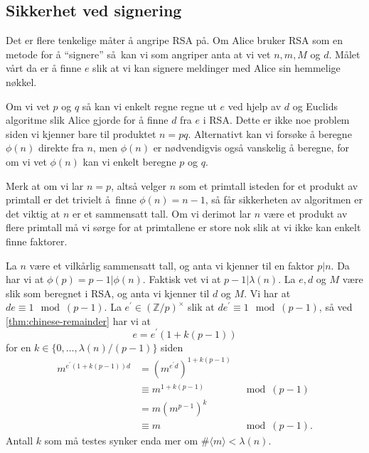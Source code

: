 \subsection{Sikkerhet ved signering}

Det er flere tenkelige måter å angripe RSA på.
Om Alice bruker RSA som en metode for å ``signere'' så kan
vi som angriper anta at vi vet $n, m, M$ og $d$.
Målet vårt da er å finne $e$ slik at vi kan signere meldinger med Alice
sin hemmelige nøkkel.

Om vi vet $p$ og $q$ så kan vi enkelt regne regne ut $e$ ved hjelp av $d$
og Euclids algoritme
slik Alice gjorde for å finne $d$ fra $e$ i RSA.
Dette er ikke noe problem siden vi kjenner bare til produktet $n = pq$.
Alternativt kan vi forsøke å beregne $\phi(n)$ direkte fra $n$,
men $\phi(n)$ er nødvendigvis også vanskelig å beregne,
for om vi vet $\phi(n)$ kan vi enkelt beregne $p$ og $q$.

Merk at om vi lar $n = p$, altså velger $n$ som et primtall isteden for et
produkt av primtall er det trivielt å finne $\phi(n) = n - 1$,
så får sikkerheten av algoritmen er det viktig at $n$ er et sammensatt tall.
Om vi derimot lar $n$ være et produkt av flere primtall må vi sørge for
at primtallene er store nok slik at vi ikke kan enkelt finne faktorer.

\begin{example}
    La $n$ være et vilkårlig sammensatt tall, og anta vi kjenner til
    en faktor $p | n$.
    Da har vi at $\phi(p) = p - 1 | \phi(n)$.
    Faktisk vet vi at $p - 1 | \lambda(n)$.
    La $e, d$ og $M$ være slik som beregnet i RSA, og anta vi kjenner til $d$ og $M$.
    Vi har at $de \equiv 1\mod (p - 1)$.
    La $e^\prime\in {(\mathbb Z / p)}^\times$ slik at $de^\prime\equiv 1 \mod (p - 1)$,
    så ved \cref{thm:chinese-remainder} har vi at
    \[
        e = e^\prime(1 + k(p - 1))
    \]
    for en $k\in \{0,\dots, \lambda(n) / (p - 1)\}$
    siden
    \[\begin{aligned}
        m^{e^\prime(1 + k(p - 1)) d}
        &= {(m^{e^\prime d})}^{1 + k(p - 1)}
        \\
        &\equiv m^{1 + k(p - 1)}
        & \mod (p - 1)
        \\
        &= m {(m^{p - 1})}^k
        \\
        &\equiv m
        &\mod (p - 1).
    \end{aligned}\]
    Antall $k$ som må testes synker enda mer om $\#\langle m\rangle < \lambda(n)$.
\end{example}

